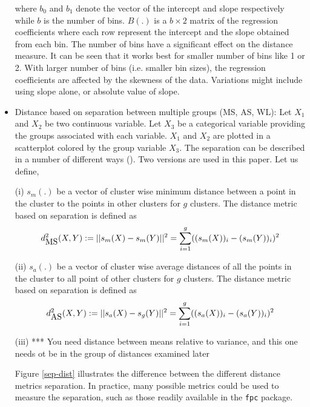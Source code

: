 \documentclass[12]{article}
\newcommand{\red}[1]{{\color{red} #1}}
\begin{document}
\begin{itemize}
where $b_0$ and $b_1$ denote the vector of the intercept and slope respectively while $b$ is the number of bins. $B(.)$ is a $b \times 2$ matrix of the regression coefficients where each row represent the  intercept and the slope obtained from each bin. The number of bins have a significant effect on the distance measure. It can be seen that it works best for smaller number of bins like 1 or 2. With larger number of bins (i.e. smaller bin sizes), the regression coefficients are affected by the skewness of the data. Variations might include using slope alone, or absolute value of slope.

\item Distance based on separation between multiple groups (MS, AS, WL): Let $X_1$ and $X_2$ be two continuous variable. Let $X_3$ be a categorical variable providing the groups associated with each variable. $X_1$ and $X_2$ are plotted in a scatterplot colored by the group variable $X_3$. The separation can be described in a number of different ways (\cite{hennig:2010}). Two versions are used in this paper. Let us define, 

(i) $s_{m}(.)$ be a vector of cluster wise minimum distance between a point in the cluster to the points in other clusters for $g$ clusters. The distance metric based on separation is defined as
\[
d^2_{\hbox{MS}}(X, Y):= ||s_m(X) - s_m(Y)||^2 = \sum_{i = 1}^g ((s_m(X))_i - (s_m(Y))_i)^2
\]

(ii)  $s_{a}(.)$ be a vector of cluster wise average distances of all the points in the cluster to all point of other clusters for $g$ clusters. The distance metric based on separation is defined as
\[
d^2_{\hbox{AS}}(X, Y):= ||s_a(X) - s_g(Y)||^2 = \sum_{i = 1}^g ((s_a(X))_i - (s_a(Y))_i)^2
\]

(iii) \red{*** You need distance between means relative to variance, and this one needs ot be in the group of distances examined later} 

Figure \ref{sep-dist} illustrates the difference between the different distance metrics separation. In practice, many possible metrics could be used to measure the separation, such as those readily available in the {\tt fpc} package.



\end{itemize}
\end{document}

